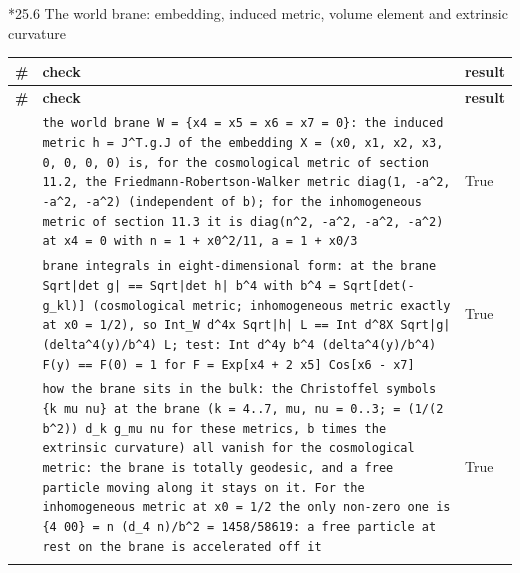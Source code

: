 \documentclass[10pt,a4paper]{article}
\makeatletter
\renewcommand\subsubsection{\@startsection{subsubsection}{3}{\z@}{-3.25ex\@plus -1ex \@minus -.2ex}{1.5ex \@plus .2ex}{\normalfont\normalsize\bfseries\raggedright}}
\makeatother
\begin{document}
\subsubsection*{25.6 The world brane: embedding, induced metric, volume element and extrinsic curvature}
{\footnotesize
\begin{longtable}{>{\raggedright\arraybackslash}p{}>{\raggedright\arraybackslash}p{}>{\raggedright\arraybackslash}p{}}
\toprule
\textbf{\#} & \textbf{check} & \textbf{result} \\
\midrule\endfirsthead
\toprule
\textbf{\#} & \textbf{check} & \textbf{result} \\
\midrule\endhead
\endfoot
\bottomrule\endlastfoot
436 & \texttt{the world brane W = \{x4 = x5 = x6 = x7 = 0\}: the induced metric h = J\textasciicircum{}T.g.J of the embedding X = (x0, x1, x2, x3, 0, 0, 0, 0) is, for the cosmological metric of section 11.2, the Friedmann-Robertson-Walker metric diag(1, -a\textasciicircum{}2, -a\textasciicircum{}2, -a\textasciicircum{}2) (independent of b); for the inhomogeneous metric of section 11.3 it is diag(n\textasciicircum{}2, -a\textasciicircum{}2, -a\textasciicircum{}2, -a\textasciicircum{}2) at x4 = 0 with n = 1 + x0\textasciicircum{}2/\allowbreak{}11, a = 1 + x0/\allowbreak{}3} & True \\
437 & \texttt{brane integrals in eight-dimensional form: at the brane Sqrt|det g| == Sqrt|det h| b\textasciicircum{}4 with b\textasciicircum{}4 = Sqrt[det(-g\_\allowbreak{}kl)] (cosmological metric; inhomogeneous metric exactly at x0 = 1/\allowbreak{}2), so Int\_\allowbreak{}W d\textasciicircum{}4x Sqrt|h| L == Int d\textasciicircum{}8X Sqrt|g| (delta\textasciicircum{}4(y)/\allowbreak{}b\textasciicircum{}4) L; test: Int d\textasciicircum{}4y b\textasciicircum{}4 (delta\textasciicircum{}4(y)/\allowbreak{}b\textasciicircum{}4) F(y) == F(0) = 1 for F = Exp[x4 + 2 x5] Cos[x6 - x7]} & True \\
438 & \texttt{how the brane sits in the bulk: the Christoffel symbols \{k mu nu\} at the brane (k = 4..7, mu, nu = 0..3; = (1/\allowbreak{}(2 b\textasciicircum{}2)) d\_\allowbreak{}k g\_\allowbreak{}mu nu for these metrics, b times the extrinsic curvature) all vanish for the cosmological metric: the brane is totally geodesic, and a free particle moving along it stays on it. For the inhomogeneous metric at x0 = 1/\allowbreak{}2 the only non-zero one is \{4 00\} = n (d\_\allowbreak{}4 n)/\allowbreak{}b\textasciicircum{}2 = 1458/\allowbreak{}58619: a free particle at rest on the brane is accelerated off it} & True \\*
\end{longtable}}
\end{document}
